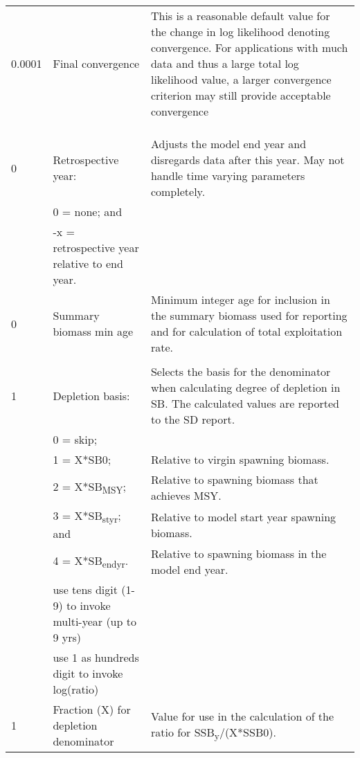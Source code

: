 {\begin{landscape}
\begin{longtable}{p{1.5cm} p{7.2cm} p{12.3cm}}
 
 \hline
 0.0001 & Final convergence & \multirow{1}{1cm}[-0.25cm]{\parbox{12.5cm}{This is a reasonable default value for the change in log likelihood denoting convergence.  For applications with much data and thus a large total log likelihood value, a larger convergence criterion may still provide acceptable convergence}}\Tstrut\\
        & & \\
        & & \\
		& & \\ 
 
 \hline
 0 & Retrospective year: & \multirow{1}{1cm}[-0.25cm]{\parbox{12.5cm}{Adjusts the model end year and disregards data after this year.  May not handle time varying parameters completely.}} \Tstrut\\
   & 0 = none; and & \\
   & -x = retrospective year relative to end year. & \\
  
 \hline
 0 & Summary biomass min age & \multirow{1}{1cm}[-0.25cm]{\parbox{12.5cm}{Minimum integer age for inclusion in the summary biomass used for reporting and for calculation of total exploitation rate.}}\Tstrut\\
   & & \\ 

 \hline
 1 & Depletion basis: & \multirow{1}{1cm}[-0.25cm]{\parbox{12.5cm}{Selects the basis for the denominator when calculating degree of depletion in SB.  The calculated values are reported to the SD report.}}\Tstrut\\
   & 0 = skip; & \\
   & 1 = X*SB0; & Relative to virgin spawning biomass.\\
   & 2 = X*SB\textsubscript{MSY}; & Relative to spawning biomass that achieves MSY.\\
   & 3 = X*SB\textsubscript{styr}; and & Relative to model start year spawning biomass.\\
   & 4 = X*SB\textsubscript{endyr}. & Relative to spawning biomass in the model end year.\\
   & use tens digit (1-9) to invoke multi-year (up to 9 yrs) & \\
   & use 1 as hundreds digit to invoke log(ratio) & \\
  
 \hline
 1 & Fraction (X) for depletion denominator & Value for use in the calculation of the ratio for SSB\textsubscript{y}/(X*SSB0).\Tstrut\\


\end{longtable}
\end{landscape}}
